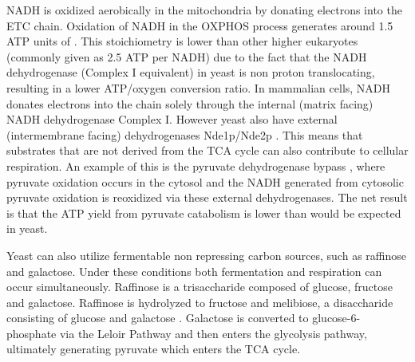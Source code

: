 NADH is oxidized aerobically in the mitochondria by donating electrons into the ETC chain. Oxidation of NADH in the OXPHOS process generates around 1.5 ATP units of \cite{ouhabi_flux-yield_1989}. This stoichiometry is lower than other higher eukaryotes (commonly given as 2.5 ATP per NADH) due to the fact that the NADH dehydrogenase (Complex I equivalent) in yeast is non proton translocating, resulting in a lower ATP/oxygen conversion ratio. In mammalian cells, NADH donates electrons into the chain solely through the internal (matrix facing) NADH dehydrogenase Complex I. However yeast also have external (intermembrane facing) dehydrogenases Nde1p/Nde2p \cite{luttik_saccharomyces_1998}. This means that substrates that are not derived from the TCA cycle can also contribute to cellular respiration. An example of this is the pyruvate dehydrogenase bypass \cite{boubekeur_mitochondrial_1999}, where pyruvate oxidation occurs in the cytosol and the NADH generated from cytosolic pyruvate oxidation is reoxidized via these external dehydrogenases. The net result is that the ATP yield from pyruvate catabolism is lower than would be expected in yeast. 

Yeast can also utilize fermentable non repressing carbon sources, such as raffinose and galactose. Under these conditions both fermentation and respiration can occur simultaneously. Raffinose is a trisaccharide composed of glucose, fructose and galactose. Raffinose is hydrolyzed to fructose and melibiose, a disaccharide consisting of glucose and galactose \cite{paulo_proteome-wide_2015}. Galactose is converted to glucose-6-phosphate via the Leloir Pathway and then enters the glycolysis pathway, ultimately generating pyruvate which enters the TCA cycle.

